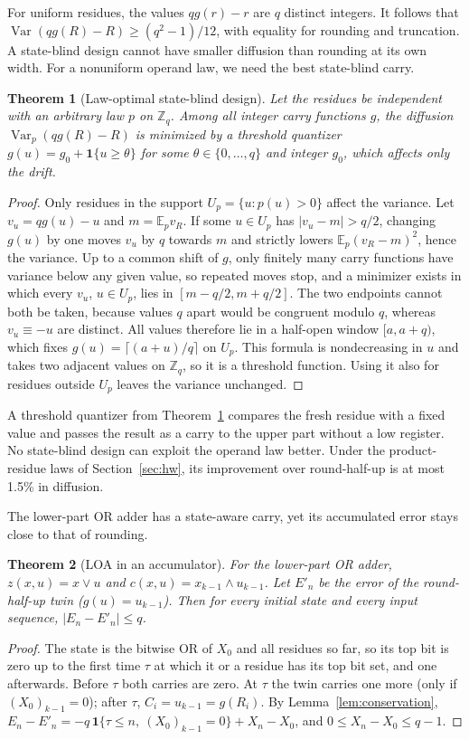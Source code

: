 \documentclass[preprint,12pt,numbers]{elsarticle}
\newcommand{\E}{\mathbb{E}}
\newcommand{\Var}{\operatorname{Var}}
\newcommand{\Z}{\mathbb{Z}}
\newtheorem{theorem}{Theorem}
\theoremstyle{definition}
\begin{document}
For uniform residues, the values $qg(r)-r$ are $q$ distinct integers.
It follows that $\Var(qg(R)-R)\ge(q^2-1)/12$, with equality for rounding and
truncation. A state-blind design cannot have smaller diffusion than
rounding at its own width.
For a nonuniform operand law, we need the best state-blind carry.
\begin{theorem}[Law-optimal state-blind design]\label{thm:threshold}
Let the residues be independent with an arbitrary law $p$ on $\Z_q$. Among
all integer carry functions $g$, the diffusion $\Var_p(qg(R)-R)$ is minimized
by a threshold quantizer $g(u)=g_0+\mathbf1\{u\ge\theta\}$ for some
$\theta\in\{0,\ldots,q\}$ and integer $g_0$, which affects only the drift.
\end{theorem}
\begin{proof}
Only residues in the support $U_p=\{u:p(u)>0\}$ affect the variance. Let
$v_u=qg(u)-u$ and $m=\E_p v_R$. If some $u\in U_p$ has $|v_u-m|>q/2$,
changing $g(u)$ by one moves $v_u$ by $q$ towards $m$ and strictly lowers
$\E_p(v_R-m)^2$, hence the variance. Up to a common shift of $g$, only
finitely many carry functions have variance below any given value, so
repeated moves stop, and a minimizer exists in which every $v_u$,
$u\in U_p$, lies in $[m-q/2,m+q/2]$. The two endpoints cannot both be
taken, because values $q$ apart would be congruent modulo $q$, whereas
$v_u\equiv-u$ are distinct. All values therefore lie in a half-open window
$[a,a+q)$, which fixes $g(u)=\lceil (a+u)/q\rceil$ on $U_p$. This formula is
nondecreasing in $u$ and takes two adjacent values on $\Z_q$, so it is a
threshold function. Using it also for residues outside $U_p$ leaves the
variance unchanged.
\end{proof}

A threshold quantizer from Theorem~\ref{thm:threshold} compares the fresh
residue with a fixed value and passes the result as a carry to the upper
part without a low register. No state-blind design can exploit the
operand law better. Under the product-residue laws of
Section~\ref{sec:hw},
its improvement
over round-half-up is at most 1.5\% in diffusion.

The lower-part OR adder has a state-aware carry, yet its accumulated
error stays close to that of rounding.
\begin{theorem}[LOA in an accumulator]\label{thm:loa}
For the lower-part OR adder, $z(x,u)=x\lor u$ and $c(x,u)=x_{k-1}\land u_{k-1}$.
Let $E'_n$ be the error of the round-half-up twin ($g(u)=u_{k-1}$). Then for
every initial state and every input sequence, $|E_n-E'_n|\le q$.
\end{theorem}
\begin{proof}
The state is the bitwise OR of $X_0$ and all residues so far, so its top bit
is zero up to the first time $\tau$ at which it or a residue has its top bit
set, and one afterwards. Before $\tau$ both carries are zero. At $\tau$ the
twin carries one more (only if $(X_0)_{k-1}=0$); after $\tau$,
$C_i=u_{k-1}=g(R_i)$. By Lemma~\ref{lem:conservation},
$E_n-E'_n=-q\,\mathbf1\{\tau\le n,\ (X_0)_{k-1}=0\}+X_n-X_0$, and
$0\le X_n-X_0\le q-1$.
\end{proof}
\end{document}
